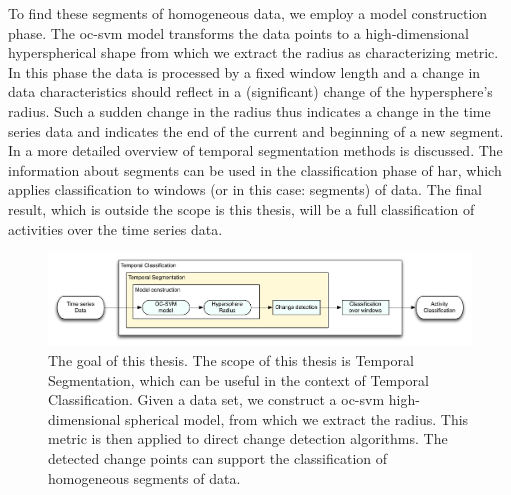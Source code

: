 To find these segments of homogeneous data, we employ a model construction phase.
The \gls{oc-svm} model transforms the data points to a high-dimensional hyperspherical shape from which we extract the radius as characterizing metric.
In this phase the data is processed by a fixed window length and a change in data characteristics should reflect in a (significant) change of the hypersphere's radius.
Such a sudden change in the radius thus indicates a change in the time series data and indicates the end of the current and beginning of a new segment.
In  a more detailed overview of temporal segmentation methods is discussed.
The information about segments can be used in the classification phase of \gls{har}, which applies classification to windows (or in this case: segments) of data.
The final result, which is outside the scope is this thesis, will be a full classification of activities over the time series data.

\begin{figure}
  \centering
    \includegraphics[width=\textwidth,height=\textheight,keepaspectratio]{./Figures/chapter1/thesis_goal.pdf}
  \caption[Thesis goal]{The goal of this thesis. The scope of this thesis is Temporal Segmentation, which can be useful in the context of Temporal Classification. Given a data set, we construct a \gls{oc-svm} high-dimensional spherical model, from which we extract the radius. This metric is then applied to direct change detection algorithms. The detected change points can support the classification of homogeneous segments of data.}
  \label{fig:thesis_goal}
\end{figure}

